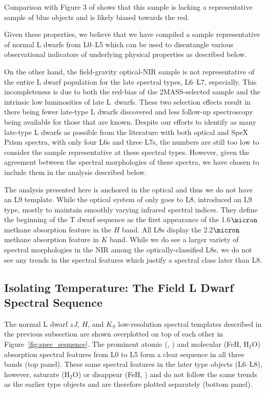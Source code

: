 \documentclass[12pt,preprint]{aastex}
\begin{document}
Comparison with Figure 3 of \cite{Schmidt10} shows that this sample is lacking a representative sample of blue objects and is likely biased towards the red.

Given these properties, we believe that we have compiled a sample representative of normal L dwarfs from L0--L5 which can be used to disentangle various observational indicators of underlying physical properties as described below.

On the other hand, the field-gravity optical-NIR sample is not representative of the entire L dwarf population for the late spectral types, L6--L7, especially. 
This incompleteness is due to both the red-bias of the 2MASS-selected sample and the intrinsic low luminosities of late L~dwarfs.
These two selection effects result in there being fewer late-type L dwarfs discovered and less follow-up spectroscopy being available for those that are known.
Despite our efforts to identify as many late-type L dwarfs as possible from the literature with both optical and SpeX Prism spectra, with only four L6s and three L7s, the numbers are still too low to consider the sample representative at these spectral types.
However, given the agreement between the spectral morphologies of these spectra, we have chosen to include them in the analysis described below.

The analysis presented here is anchored in the optical and thus we do not have an L9 template.
While the optical system of \cite{K99} only goes to L8, \cite{Geballe02} introduced an L9 type, mostly to maintain smoothly varying infrared spectral indices.
They define the beginning of the T dwarf sequence as the first appearance of the 1.6$\micron$ methane absorption feature in the $H$ band.
All L8s display the 2.2$\micron$ methane absorption feature in $K$ band.
While we do see a larger variety of spectral morphologies in the NIR among the optically-classified L8s, we do not see any trends in the spectral features which justify a spectral class later than L8.

\subsection{Isolating Temperature: The Field L Dwarf Spectral Sequence}
\label{sec:temp}
The normal L dwarf $zJ$, $H$, and $K_S$ low-resolution spectral templates described in the previous subsection are shown overplotted on top of each other in Figure~\ref{fig:spec_sequence}. 
The prominent atomic (, ) and molecular (FeH, H$_2$O) absorption spectral features from L0 to L5 form a clear sequence in all three bands (top panel).
These same spectral features in the later type objects (L6--L8), however, saturate (H$_2$O) or disappear (FeH, ) and do not follow the same trends as the earlier type objects and are therefore plotted separately (bottom panel).
\end{document}

